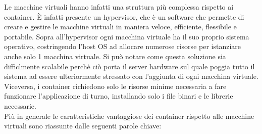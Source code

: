 Le macchine virtuali hanno infatti una struttura più complessa rispetto ai container. È infatti presente un hypervisor\cite{hypervisor}, che è un software che permette di creare e gestire le macchine virtuali in maniera veloce, efficiente, flessibile e portabile.
Sopra all'hypervisor ogni macchina virtuale ha il suo proprio sistema operativo, costringendo l'host OS ad allocare numerose risorse per istanziare anche solo 1 macchina virtuale. Si può notare come questa soluzione sia difficlmente scalabile perchè
ciò porta il server hardware sul quale poggia tutto il sistema ad essere ulteriormente stressato con l'aggiunta di ogni macchina virtuale. Viceversa, i container richiedono solo le risorse minime necessaria a fare funzionare l'applicazione di turno, installando solo i file binari e le librerie necessarie.\\
Più in generale le caratteristiche vantaggiose dei container rispetto alle macchine virtuali sono riassunte dalle seguenti parole chiave:\\


